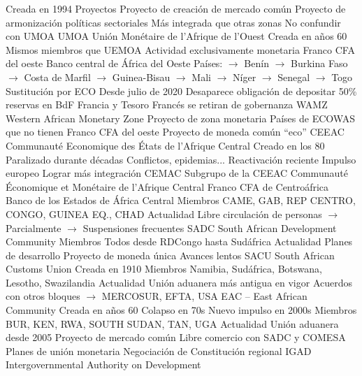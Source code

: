 \documentclass{nuevotema}
\begin{document}
\begin{esquemal}
				\4 Creada en 1994
				\4 Proyectos
				\4[] Proyecto de creación de mercado común
				\4[] Proyecto de armonización políticas sectoriales
				\4 Más integrada que otras zonas
				\4 No confundir con UMOA
			\3 UMOA
				\4 Unión Monétaire de l'Afrique de l'Ouest
				\4 Creada en años 60
				\4 Mismos miembros que UEMOA
				\4 Actividad exclusivamente monetaria
				\4 Franco CFA del oeste
				\4[] Banco central de África del Oeste
				\4[] Países:
				\4[] $\to$ Benín
				\4[] $\to$ Burkina Faso
				\4[] $\to$ Costa de Marfil
				\4[] $\to$ Guinea-Bisau
				\4[] $\to$ Mali
				\4[] $\to$ Níger
				\4[] $\to$ Senegal
				\4[] $\to$ Togo
				\4 Sustitución por ECO
				\4[] Desde julio de 2020
				\4[] Desaparece obligación de depositar 50\% reservas en BdF
				\4[] Francia y Tesoro Francés se retiran de gobernanza
			\3 WAMZ
				\4 Western African Monetary Zone
				\4 Proyecto de zona monetaria
				\4[] Países de ECOWAS que no tienen Franco CFA del oeste
				\4 Proyecto de moneda común ``eco''
			\3 CEEAC
				\4 Communauté Economique des États de l'Afrique Central
				\4 Creado en los 80
				\4 Paralizado durante décadas
				\4[] Conflictos, epidemias...
				\4 Reactivación reciente
				\4[] Impulso europeo
				\4[] Lograr más integración
			\3 CEMAC
				\4 Subgrupo de la CEEAC
				\4 Communauté Économique et Monétaire de l'Afrique Central
				\4[] Franco CFA de Centroáfrica
				\4[] Banco de los Estados de África Central
				\4 Miembros
				\4[] CAME, GAB, REP CENTRO, CONGO, GUINEA EQ., CHAD
				\4 Actualidad
				\4[] Libre circulación de personas
				\4[] $\to$ Parcialmente
				\4[] $\to$ Suspensiones frecuentes
			\3 SADC
				\4 South African Development Community
				\4 Miembros
				\4[] Todos desde RDCongo hasta Sudáfrica
				\4 Actualidad
				\4[] Planes de desarrollo
				\4[] Proyecto de moneda única
				\4[] Avances lentos
			\3 SACU
				\4 South African Customs Union
				\4 Creada en 1910
				\4 Miembros
				\4[] Namibia, Sudáfrica, Botswana, Lesotho, Swazilandia
				\4 Actualidad
				\4[] Unión aduanera más antigua en vigor
				\4[] Acuerdos con otros bloques
				\4[] $\to$ MERCOSUR, EFTA, USA
			\3 EAC -- East African Community
				\4 Creada en años 60
				\4[] Colapso en 70s
				\4[] Nuevo impulso en 2000s
				\4 Miembros
				\4[] BUR, KEN, RWA, SOUTH SUDAN,
				\4[] TAN, UGA
				\4 Actualidad
				\4[] Unión aduanera desde 2005
				\4[] Proyecto de mercado común
				\4[] Libre comercio con SADC y COMESA
				\4[] Planes de unión monetaria
				\4[] Negociación de Constitución regional
			\3 IGAD
				\4 Intergovernmental Authority on Development

\end{esquemal}
\end{document}
